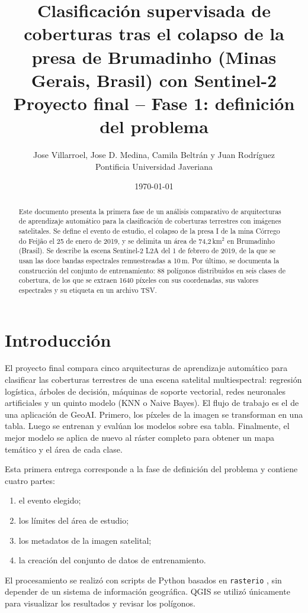 \documentclass{article}
\title{Clasificación supervisada de coberturas tras el colapso de la presa de Brumadinho (Minas Gerais, Brasil) con Sentinel-2\\[0.5em]
\large Proyecto final -- Fase 1: definición del problema}
\author{Jose Villarroel, Jose D. Medina, Camila Beltrán y Juan Rodríguez\\Pontificia Universidad Javeriana}
\date{\today}
\begin{document}
\maketitle

\begin{abstract}
Este documento presenta la primera fase de un análisis comparativo de arquitecturas de aprendizaje automático para la clasificación de coberturas terrestres con imágenes satelitales. Se define el evento de estudio, el colapso de la presa I de la mina Córrego do Feijão el 25 de enero de 2019, y se delimita un área de 74{,}2\,km$^2$ en Brumadinho (Brasil). Se describe la escena Sentinel-2 L2A del 1 de febrero de 2019, de la que se usan las doce bandas espectrales remuestreadas a 10\,m. Por último, se documenta la construcción del conjunto de entrenamiento: 88 polígonos distribuidos en seis clases de cobertura, de los que se extraen 1640 píxeles con sus coordenadas, sus valores espectrales y su etiqueta en un archivo TSV.
\end{abstract}

\section{Introducción}
El proyecto final compara cinco arquitecturas de aprendizaje automático para clasificar las coberturas terrestres de una escena satelital multiespectral: regresión logística, árboles de decisión, máquinas de soporte vectorial, redes neuronales artificiales y un quinto modelo (KNN o Naive Bayes). El flujo de trabajo es el de una aplicación de GeoAI. Primero, los píxeles de la imagen se transforman en una tabla. Luego se entrenan y evalúan los modelos sobre esa tabla. Finalmente, el mejor modelo se aplica de nuevo al ráster completo para obtener un mapa temático y el área de cada clase.

Esta primera entrega corresponde a la fase de definición del problema y contiene cuatro partes:
\begin{enumerate}
 \item el evento elegido;
 \item los límites del área de estudio;
 \item los metadatos de la imagen satelital;
 \item la creación del conjunto de datos de entrenamiento.
\end{enumerate}
El procesamiento se realizó con scripts de Python basados en \texttt{rasterio} \parencite{GDAL}, sin depender de un sistema de información geográfica. QGIS \parencite{QGIS_Software} se utilizó únicamente para visualizar los resultados y revisar los polígonos.
\end{document}
